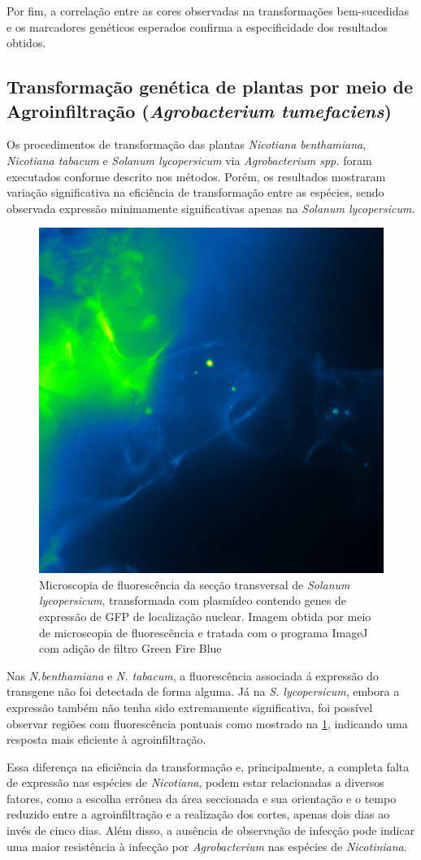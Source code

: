 Por fim, a correlação entre as cores observadas na transformações bem-sucedidas
e os marcadores genéticos esperados confirma a especificidade dos resultados
obtidos.

\subsection{Transformação genética de plantas por meio de Agroinfiltração
(\textit{Agrobacterium tumefaciens})}
Os procedimentos de transformação das plantas \textit{Nicotiana benthamiana},
\textit{Nicotiana tabacum} e \textit{Solanum lycopersicum} via
\textit{Agrobacterium spp.} foram executados conforme descrito nos métodos.
Porém, os resultados mostraram variação significativa na eficiência de
transformação entre as espécies, sendo observada expressão minimamente
significativas apenas na \textit{Solanum lycopersicum}. 

\begin{figure}
	\centering
	\includegraphics[width=.30\textwidth]{fig/tomate.png}
    \caption{Microscopia de fluorescência da secção transversal de
    \textit{Solanum lycopersicum}, transformada com plasmídeo contendo genes de
    expressão de GFP de localização nuclear. Imagem obtida por meio de microscopia
    de fluorescência e tratada com o programa ImageJ com adição de filtro Green Fire
    Blue}
	\label{lyco}
\end{figure}

Nas \textit{N.benthamiana} e \textit{N. tabacum}, a fluorescência associada á expressão do
transgene não foi detectada de forma alguma. Já na \textit{S.  lycopersicum},
embora a expressão também não tenha sido extremamente significativa, foi
possível observar regiões com fluorescência pontuais como mostrado na
\cref{lyco}, indicando uma resposta mais eficiente à agroinfiltração.

Essa diferença na eficiência da transformação e, principalmente, a completa
falta de expressão nas espécies de \textit{Nicotiana}, podem estar relacionadas a
diversos fatores, como a escolha errônea da área seccionada e sua orientação e o
tempo reduzido entre a agroinfiltração e a realização dos cortes, apenas dois
dias ao invés de cinco dias. Além disso, a ausência de observação de infecção pode indicar uma maior resistência à infecção
por \textit{Agrobacterium} nas espécies de \textit{Nicotiniana}.

